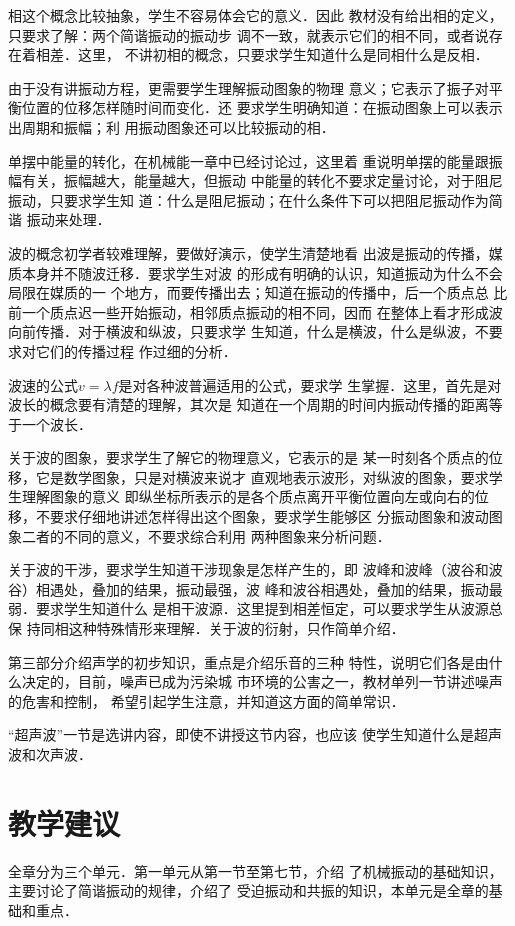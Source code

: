 相这个概念比较抽象，学生不容易体会它的意义．因此
教材没有给出相的定义，只要求了解：两个简谐振动的振动步
调不一致，就表示它们的相不同，或者说存在着相差．这里，
不讲初相的概念，只要求学生知道什么是同相什么是反相．

由于没有讲振动方程，更需要学生理解振动图象的物理
意义；它表示了振子对平衡位置的位移怎样随时间而变化．还
要求学生明确知道：在振动图象上可以表示出周期和振幅；利
用振动图象还可以比较振动的相．

单摆中能量的转化，在机械能一章中已经讨论过，这里着
重说明单摆的能量跟振幅有关，振幅越大，能量越大，但振动
中能量的转化不要求定量讨论，对于阻尼振动，只要求学生知
道：什么是阻尼振动；在什么条件下可以把阻尼振动作为简谐
振动来处理．

波的概念初学者较难理解，要做好演示，使学生清楚地看
出波是振动的传播，媒质本身并不随波迁移．要求学生对波
的形成有明确的认识，知道振动为什么不会局限在媒质的一
个地方，而要传播出去；知道在振动的传播中，后一个质点总
比前一个质点迟一些开始振动，相邻质点振动的相不同，因而
在整体上看才形成波向前传播．对于横波和纵波，只要求学
生知道，什么是横波，什么是纵波，不要求对它们的传播过程
作过细的分析．

波速的公式$v=\lambda f$是对各种波普遍适用的公式，要求学
生掌握．这里，首先是对波长的概念要有清楚的理解，其次是
知道在一个周期的时间内振动传播的距离等于一个波长．

关于波的图象，要求学生了解它的物理意义，它表示的是
某一时刻各个质点的位移，它是数学图象，只是对横波来说才
直观地表示波形，对纵波的图象，要求学生理解图象的意义
即纵坐标所表示的是各个质点离开平衡位置向左或向右的位
移，不要求仔细地讲述怎样得出这个图象，要求学生能够区
分振动图象和波动图象二者的不同的意义，不要求综合利用
两种图象来分析问题．

关于波的干涉，要求学生知道干涉现象是怎样产生的，即
波峰和波峰（波谷和波谷）相遇处，叠加的结果，振动最强，波
峰和波谷相遇处，叠加的结果，振动最弱．要求学生知道什么
是相干波源．这里提到相差恒定，可以要求学生从波源总保
持同相这种特殊情形来理解．关于波的衍射，只作简单介绍．

第三部分介绍声学的初步知识，重点是介绍乐音的三种
特性，说明它们各是由什么决定的，目前，噪声已成为污染城
市环境的公害之一，教材单列一节讲述噪声的危害和控制，
希望引起学生注意，并知道这方面的简单常识．

“超声波”一节是选讲内容，即使不讲授这节内容，也应该
使学生知道什么是超声波和次声波．

\section{教学建议}
全章分为三个单元．第一单元从第一节至第七节，介绍
了机械振动的基础知识，主要讨论了简谐振动的规律，介绍了
受迫振动和共振的知识，本单元是全章的基础和重点．


